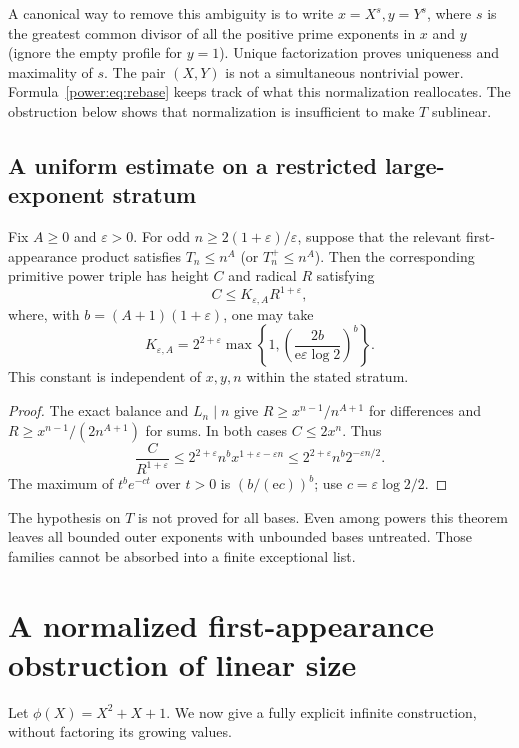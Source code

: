 A canonical way to remove this ambiguity is to write
$x=X^s,y=Y^s$, where $s$ is the greatest common divisor of all the positive
prime exponents in $x$ and $y$ (ignore the empty profile for $y=1$).
Unique factorization proves uniqueness and maximality of $s$. The pair
$(X,Y)$ is not a simultaneous nontrivial power. Formula~\eqref{power:eq:rebase}
keeps track of what this normalization reallocates. The obstruction below
shows that normalization is insufficient to make $T$ sublinear.

\subsection{A uniform estimate on a restricted large-exponent stratum}
\begin{theorem}\label{power:thm:stratum}
Fix $A\ge0$ and $\varepsilon>0$. For odd
$n\ge 2(1+\varepsilon)/\varepsilon$, suppose that the relevant
first-appearance product satisfies $T_n\le n^A$ (or $T_n^+\le n^A$).
Then the corresponding primitive power triple has height $C$ and radical
$R$ satisfying
\[
C\le K_{\varepsilon,A}R^{1+\varepsilon},
\]
where, with $b=(A+1)(1+\varepsilon)$, one may take
\[
K_{\varepsilon,A}=2^{2+\varepsilon}
\max\left\{1,\left(\frac{2b}{\mathrm e\varepsilon\log 2}\right)^b\right\}.
\]
This constant is independent of $x,y,n$ within the stated stratum.
\end{theorem}
\begin{proof}
The exact balance and $L_n\mid n$ give $R\ge x^{n-1}/n^{A+1}$ for
differences and $R\ge x^{n-1}/(2n^{A+1})$ for sums. In both cases
$C\le2x^n$. Thus
\[
\frac{C}{R^{1+\varepsilon}}
\le2^{2+\varepsilon}n^b x^{1+\varepsilon-\varepsilon n}
\le2^{2+\varepsilon}n^b2^{-\varepsilon n/2}.
\]
The maximum of $t^b e^{-ct}$ over $t>0$ is $(b/(\mathrm e c))^b$;
use $c=\varepsilon\log2/2$.
\end{proof}
The hypothesis on $T$ is not proved for all bases. Even among powers this
theorem leaves all bounded outer exponents with unbounded bases untreated.
Those families cannot be absorbed into a finite exceptional list.

\section{A normalized first-appearance obstruction of linear size}
Let $\phi(X)=X^2+X+1$. We now give a fully explicit infinite construction,
without factoring its growing values.

